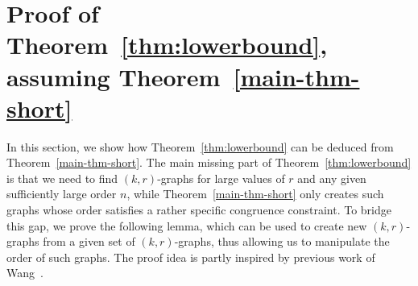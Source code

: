\documentclass[a4paper,10pt,hidelinks]{amsart}
\theoremstyle{definition}
\begin{document}
\section{Proof of Theorem~\ref{thm:lowerbound}, assuming Theorem~\ref{main-thm-short}}\label{sec:deduct}
In this section, we show how Theorem~\ref{thm:lowerbound} can be deduced from Theorem~\ref{main-thm-short}. The main missing part of Theorem~\ref{thm:lowerbound} is that we need to find $(k,r)$-graphs for large values of $r$ and any given sufficiently large order $n$, while Theorem~\ref{main-thm-short} only creates such graphs whose order satisfies a rather specific congruence constraint. To bridge this gap, we prove the following lemma, which can be used to create new $(k,r)$-graphs from a given set of $(k,r)$-graphs, thus allowing us to manipulate the order of such graphs. The proof idea is partly inspired by previous work of Wang~\cite{wang}.
\end{document}
